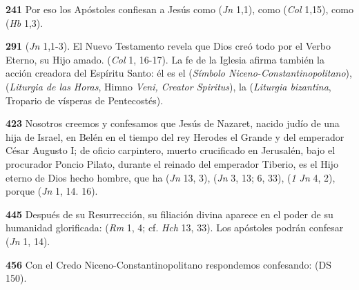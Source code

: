 \textbf{241} Por eso los Apóstoles confiesan a Jesús como  (\emph{Jn} 1,1), como  (\emph{Col} 1,15), como  (\emph{Hb} 1,3).

\textbf{291}  (\emph{Jn} 1,1-3). El Nuevo Testamento revela que Dios creó todo por el Verbo Eterno, su Hijo amado.  (\emph{Col} 1, 16-17). La fe de la Iglesia afirma también la acción creadora del Espíritu Santo: él es el  (\emph{Símbolo Niceno-Constantinopolitano}),  (\emph{Liturgia de las Horas}, Himno \emph{Veni, Creator Spiritus}), la  (\emph{Liturgia bizantina}, Tropario de vísperas de Pentecostés).

\textbf{423} Nosotros creemos y confesamos que Jesús de Nazaret, nacido judío de una hija de Israel, en Belén en el tiempo del rey Herodes el Grande y del emperador César Augusto I; de oficio carpintero, muerto crucificado en Jerusalén, bajo el procurador Poncio Pilato, durante el reinado del emperador Tiberio, es el Hijo eterno de Dios hecho hombre, que ha  (\emph{Jn} 13, 3),  (\emph{Jn} 3, 13; 6, 33),  (\emph{1 Jn} 4, 2), porque  (\emph{Jn} 1, 14. 16).

\textbf{445} Después de su Resurrección, su filiación divina aparece en el poder de su humanidad glorificada:  (\emph{Rm} 1, 4; cf. \emph{Hch} 13, 33). Los apóstoles podrán confesar  (\emph{Jn} 1, 14).

\textbf{456} Con el Credo Niceno-Constantinopolitano respondemos confesando:  (DS 150).


